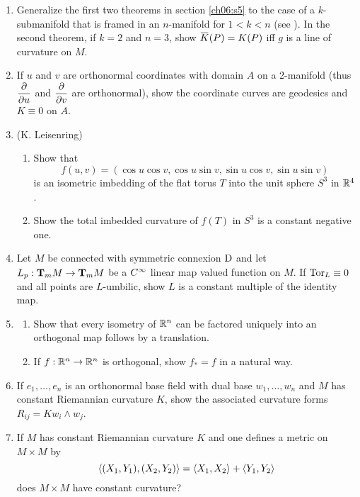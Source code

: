\documentclass[../main]{subfiles}
\begin{document}
\begin{enumerate}
\item\label{pro:55} Generalize the first two theorems in section \ref{ch06:s5} to the case of a $k$-submanifold that is framed in an $n$-manifold for $1<k<n$ (see \cite{hicks1963connection}). In the second theorem, if $k=2$ and $n=3$, show $\xoverline K(P)=K(P)$ iff $g$ is a line of curvature on $M$.

\item\label{pro:56} If $u$ and $v$ are orthonormal coordinates with domain $A$ on a 2-manifold (thus $\pdv{}{u}$ and $\pdv{}{v}$ are orthonormal), show the coordinate curves are geodesics and $K\equiv0$ on $A$.

\item\label{pro:57} (K. Leisenring)
\begin{enumerate}[label=(\roman*)]
    \item Show that
\[f(u,v) = (\cos u\cos v,\cos u\sin v,\sin u\cos v,\sin u\sin v)\]
is an isometric imbedding of the flat torus $T$ into the unit sphere $S^3$ in $\bR^4$.
    \item  Show the total imbedded curvature of $f(T)$ in $S^3$ is a constant negative one.
\end{enumerate}


\item\label{pro:58} Let $M$ be connected with symmetric connexion $\D$ and let \newline$L_p:\ts Mm\functionMaps\ts Mm$ be a $\CInfty$ linear map valued function on $M$. If $\Tor_L\equiv0$ and all points are $L$-umbilic, show $L$ is a constant multiple of the identity map.

\item\label{pro:59} 
\begin{enumerate}[label=(\roman*)]
    \item Show that every isometry of $\bR^n$ can be factored uniquely into an orthogonal map follows by a translation.
    \item  If $f:\bR^n\functionMaps\bR^n$ is orthogonal, show $f_*=f$ in a natural way.

\end{enumerate}

\item\label{pro:60} If $e_1,\ldots,e_n$ is an orthonormal base field with dual base $w_1,\ldots,w_n$ and $M$ has constant Riemannian curvature $K$, show the associated curvature forms $R_{ij}=Kw_i\wedge w_j$.

\item\label{pro:61} If $M$ has constant Riemannian curvature $K$ and one defines a metric on $M\times M$ by
\[\ip{(X_1,Y_1)}{(X_2,Y_2)} = \ip{X_1}{X_2} + \ip{Y_1}{Y_2}\]
does $M\times M$ have constant curvature?


\end{enumerate}
\end{document}

